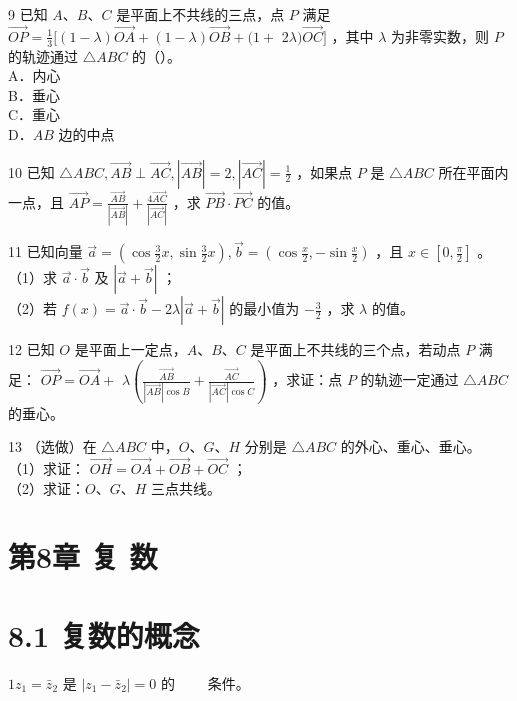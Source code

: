 \documentclass[10pt]{article}
\begin{document}
9 已知 \(A 、 B 、 C\) 是平面上不共线的三点，点 \(P\) 满足 \(\overrightarrow{O P}=\frac{1}{3}[(1-\lambda) \overrightarrow{O A}+(1-\lambda) \overrightarrow{O B}+(1+\) \(2 \lambda) \overrightarrow{O C}]\) ，其中 \(\lambda\) 为非零实数，则 \(P\) 的轨迹通过 \(\triangle A B C\) 的（）。\\
A．内心\\
B．垂心\\
C．重心\\
D．\(A B\) 边的中点

10 已知 \(\triangle A B C, \overrightarrow{A B} \perp \overrightarrow{A C},|\overrightarrow{A B}|=2,|\overrightarrow{A C}|=\frac{1}{2}\) ，如果点 \(P\) 是 \(\triangle A B C\) 所在平面内一点，且 \(\overrightarrow{A P}=\frac{\overrightarrow{A B}}{|\overrightarrow{A B}|}+\frac{4 \overrightarrow{A C}}{|\overrightarrow{A C}|}\) ，求 \(\overrightarrow{P B} \cdot \overrightarrow{P C}\) 的值。

11 已知向量 \(\vec{a}=\left(\cos \frac{3}{2} x, \sin \frac{3}{2} x\right), \vec{b}=\left(\cos \frac{x}{2},-\sin \frac{x}{2}\right)\) ，且 \(x \in\left[0, \frac{\pi}{2}\right]\) 。\\
（1）求 \(\vec{a} \cdot \vec{b}\) 及 \(|\vec{a}+\vec{b}|\) ；\\
（2）若 \(f(x)=\vec{a} \cdot \vec{b}-2 \lambda|\vec{a}+\vec{b}|\) 的最小值为 \(-\frac{3}{2}\) ，求 \(\lambda\) 的值。

12 已知 \(O\) 是平面上一定点，\(A 、 B 、 C\) 是平面上不共线的三个点，若动点 \(P\) 满足： \(\overrightarrow{O P}=\overrightarrow{O A}+\) \(\lambda\left(\frac{\overrightarrow{A B}}{|\overrightarrow{A B}| \cos B}+\frac{\overrightarrow{A C}}{|\overrightarrow{A C}| \cos C}\right)\) ，求证：点 \(P\) 的轨迹一定通过 \(\triangle A B C\) 的垂心。

13 （选做）在 \(\triangle A B C\) 中，\(O 、 G 、 H\) 分别是 \(\triangle A B C\) 的外心、重心、垂心。\\
（1）求证： \(\overrightarrow{O H}=\overrightarrow{O A}+\overrightarrow{O B}+\overrightarrow{O C}\) ；\\
（2）求证：\(O 、 G 、 H\) 三点共线。

\section*{第8章 复 数}
\section*{8.1 复数的概念}
\(1 z_{1}=\bar{z}_{2}\) 是 \(\left|z_{1}-\bar{z}_{2}\right|=0\) 的 \(\qquad\)条件。
\end{document}
